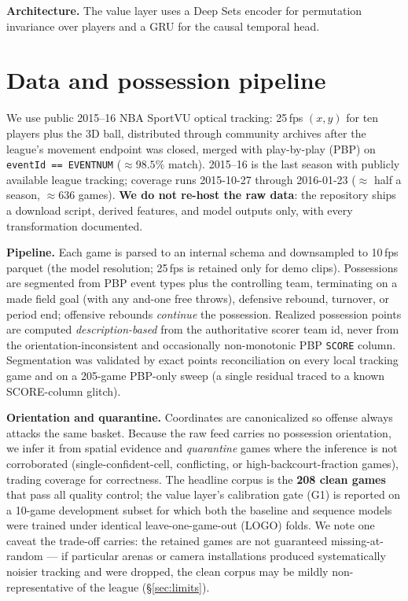 \documentclass[11pt]{article}
\begin{document}
\textbf{Architecture.} The value layer uses a Deep Sets \citep{zaheer2017deepsets} encoder for
permutation invariance over players and a GRU \citep{cho2014gru} for the causal temporal head.

\section{Data and possession pipeline}\label{sec:data}
We use public 2015--16 NBA SportVU optical tracking: 25\,fps $(x,y)$ for ten players plus the 3D
ball, distributed through community archives \citep{linou2016movements} after the league's movement
endpoint was closed, merged with play-by-play (PBP) on \texttt{eventId == EVENTNUM} ($\approx\!98.5\%$
match). 2015--16 is the last season with publicly available league tracking; coverage runs
2015-10-27 through 2016-01-23 ($\approx$ half a season, $\approx\!636$ games). \textbf{We do not
re-host the raw data}: the repository ships a download script, derived features, and model outputs only,
with every transformation documented.

\textbf{Pipeline.} Each game is parsed to an internal schema and downsampled to 10\,fps parquet
(the model resolution; 25\,fps is retained only for demo clips). Possessions are segmented from PBP
event types plus the controlling team, terminating on a made field goal (with any and-one free throws),
defensive rebound, turnover, or period end; offensive rebounds \emph{continue} the possession. Realized
possession points are computed \emph{description-based} from the authoritative scorer team id, never from
the orientation-inconsistent and occasionally non-monotonic PBP \texttt{SCORE} column. Segmentation was
validated by exact points reconciliation on every local tracking game and on a 205-game PBP-only sweep
(a single residual traced to a known SCORE-column glitch).

\textbf{Orientation and quarantine.} Coordinates are canonicalized so offense always attacks the same
basket. Because the raw feed carries no possession orientation, we infer it from spatial evidence and
\emph{quarantine} games where the inference is not corroborated (single-confident-cell, conflicting, or
high-backcourt-fraction games), trading coverage for correctness. The headline corpus is the
\textbf{208 clean games} that pass all quality control; the value layer's calibration gate (G1) is
reported on a 10-game development subset for which both the baseline and sequence models were trained
under identical leave-one-game-out (LOGO) folds. We note one caveat the trade-off carries: the retained
games are not guaranteed missing-at-random --- if particular arenas or camera installations produced
systematically noisier tracking and were dropped, the clean corpus may be mildly non-representative of
the league (\S\ref{sec:limits}).
\end{document}
